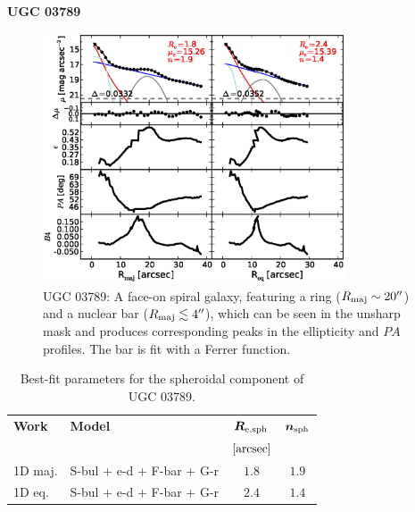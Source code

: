 \documentclass[preprint2]{emulateapj}
\newcommand{\fitfigurewidth}{0.8\textwidth}
\begin{document}
  \clearpage\newpage\noindent
  {\bf UGC 03789 \\}

  \begin{figure}[h]
  \begin{center}
  \includegraphics[width=\fitfigurewidth]{ugc03789_1Dfit.eps}
  \caption{UGC 03789:
  A face-on spiral galaxy, 
  featuring a ring ($R_{\rm maj} \sim 20''$) and a nuclear bar ($R_{\rm maj} \lesssim 4''$),
  which can be seen in the unsharp mask and produces corresponding peaks in the ellipticity and $PA$ profiles.
  The bar is fit with a Ferrer function.
  }
  \end{center}
  \end{figure}

  \begin{table}[h]
  \small
  \caption{Best-fit parameters for the spheroidal component of UGC 03789.}
  \begin{center}
  \begin{tabular}{llcc}
  \hline
  {\bf Work} & {\bf Model}   & $\bm R_{\rm e,sph}$    & $\bm n_{\rm sph}$ \\
    &  &  $[\rm arcsec]$ & \\
  \hline
  1D maj. & S-bul + e-d + F-bar + G-r & $1.8$  &  $1.9$ \\
  1D eq.  & S-bul + e-d + F-bar + G-r & $2.4$  &  $1.4$ \\
  \hline
  \end{tabular}
  \end{center}
  \label{tab:ugc3789}
  \end{table}
\end{document}
